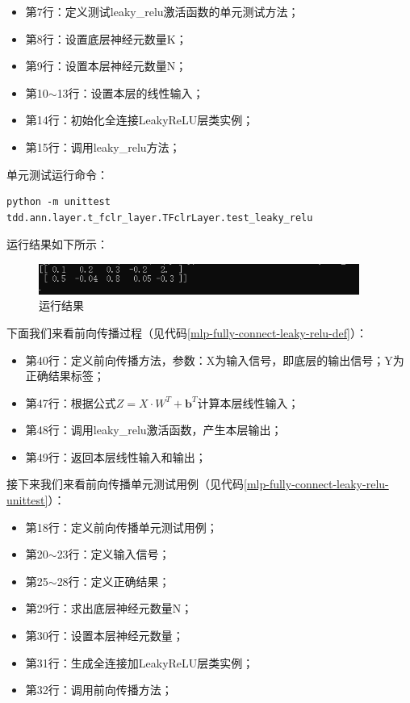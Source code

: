\documentclass[UTF8]{article}
\begin{document}
\begin{itemize}
\item 第7行：定义测试leaky\_relu激活函数的单元测试方法；
\item 第8行：设置底层神经元数量K；
\item 第9行：设置本层神经元数量N；
\item 第10$\sim$13行：设置本层的线性输入；
\item 第14行：初始化全连接LeakyReLU层类实例；
\item 第15行：调用leaky\_relu方法；
\end{itemize}
单元测试运行命令：
\begin{lstlisting}
python -m unittest tdd.ann.layer.t_fclr_layer.TFclrLayer.test_leaky_relu
\end{lstlisting}
运行结果如下所示：
\begin{figure}[H]
	\caption{运行结果}
	\label{f000069}
	\centering
	\includegraphics[height=1.0cm]{images/f000069}
\end{figure}
下面我们来看前向传播过程（见代码\ref{mlp-fully-connect-leaky-relu-def}）：
\begin{itemize}
\item 第40行：定义前向传播方法，参数：X为输入信号，即底层的输出信号；Y为正确结果标签；
\item 第47行：根据公式$Z=X \cdot W^{T} + \boldsymbol{b}^{T}$计算本层线性输入；
\item 第48行：调用leaky\_relu激活函数，产生本层输出；
\item 第49行：返回本层线性输入和输出；
\end{itemize}
接下来我们来看前向传播单元测试用例（见代码\ref{mlp-fully-connect-leaky-relu-unittest}）：
\begin{itemize}
\item 第18行：定义前向传播单元测试用例；
\item 第20$\sim$23行：定义输入信号；
\item 第25$\sim$28行：定义正确结果；
\item 第29行：求出底层神经元数量N；
\item 第30行：设置本层神经元数量；
\item 第31行：生成全连接加LeakyReLU层类实例；
\item 第32行：调用前向传播方法；
\end{itemize}
\end{document}
